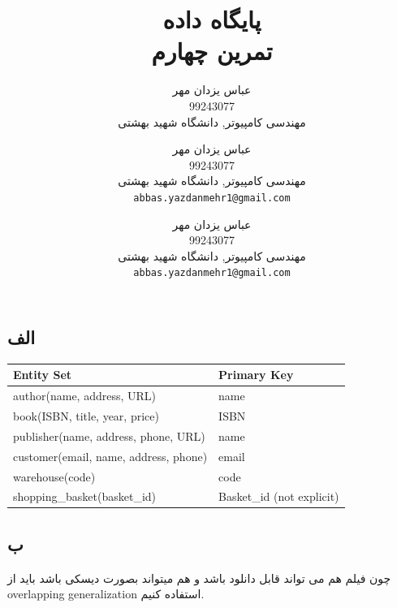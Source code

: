 \documentclass[a4paper]{article}
\author{\noindent
عباس یزدان مهر
\\
99243077\\
 مهندسی کامپیوتر, دانشگاه شهید بهشتی
\\
\emailone
	}
\makeatletter
\newcommand{\emailone}{\texttt{abbas.yazdanmehr1@gmail.com}}
\newcommand{\fulltitle}[2]{\title{#1 \\ #2}}
\newcommand{\myinf}{
	\author{\noindent
عباس یزدان مهر
\\
99243077\\
 مهندسی کامپیوتر, دانشگاه شهید بهشتی
\\
\emailone
	}
}
\makeatother
\begin{document}
\fulltitle{
پایگاه داده
}{
تمرین چهارم
}

\myinf

\maketitle

\newpage


\myinf
\section{}
\subsection*{الف}

\begin{latin}
  \begin{table}[H]
    \begin{small}
      \begin{center}
        \begin{tabular}[c]{|l|l|}
          \hline
          Entity Set & Primary Key \\
          \hline
          \hline
          author(name, address, URL) & name \\
          \hline
          book(ISBN, title, year, price) & ISBN \\
          \hline
          publisher(name, address, phone, URL) & name \\
          \hline
          customer(email, name, address, phone) & email \\
          \hline
          warehouse(code) & code \\
          \hline
          shopping\_basket(basket\_id) & Basket\_id (not explicit)\\
          \hline
        \end{tabular}
      \end{center}
    \end{small}
  \end{table}
  
\end{latin}

\subsection*{ب}
چون فیلم هم می تواند قابل دانلود باشد و هم میتواند بصورت دیسکی
باشد باید از overlapping generalization استفاده کنیم. 
\end{document}

